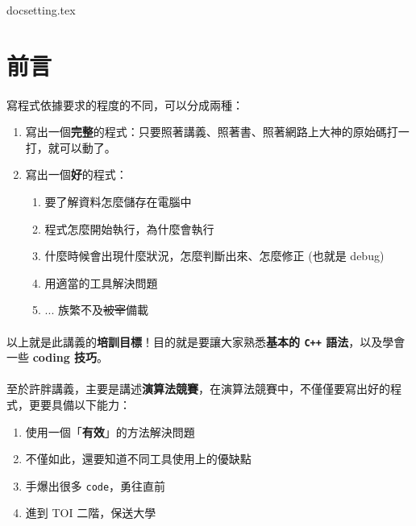 \documentclass[12pt,a4paper,oneside]{article}
\begin{document}
\begin{CJK}{UTF8}{bkai}

{docsetting.tex}
\setcounter{section}{0}

\fi

\section*{前言}

\paragraph{}寫程式依據要求的程度的不同，可以分成兩種：
\begin{enumerate}
\item 寫出一個\textbf{完整}的程式：只要照著講義、照著書、照著網路上大神的原始碼打一打，就可以動了。
\item 寫出一個\textbf{好}的程式：
  \begin{enumerate}
    \item 要了解資料怎麼儲存在電腦中
    \item 程式怎麼開始執行，為什麼會執行
    \item 什麼時候會出現什麼狀況，怎麼判斷出來、怎麼修正 (也就是 debug)
    \item 用適當的工具解決問題
    \item ... 族繁不及\sout{被宰}備載
  \end{enumerate}
\end{enumerate}

\paragraph{}以上就是此講義的\textbf{培訓目標}！目的就是要讓大家熟悉\textbf{基本的 \texttt{C++} 語法}，以及學會一些 \textbf{coding 技巧}。

\paragraph{}至於許胖講義，主要是講述\textbf{演算法競賽}，在演算法競賽中，不僅僅要寫出好的程式，更要具備以下能力：
\begin{enumerate}
\item 使用一個「\textbf{有效}」的方法解決問題
\item 不僅如此，還要知道不同工具使用上的優缺點
\item 手爆出很多 \texttt{code}，勇往直前
\item 進到 TOI 二階，保送大學
\end{enumerate}


\end{CJK}
\end{document}

